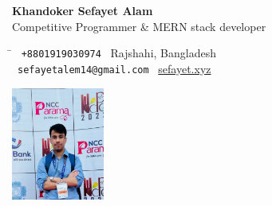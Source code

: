 \documentclass[a4paper,10pt]{article}
\begin{document}
\begin{minipage}{0.65\textwidth}
    \vspace{0.2in}
    \Huge \textbf{Khandoker Sefayet Alam} \\
    \large Competitive Programmer \& MERN stack developer \\
    \vspace{0.1in}
    \normalsize
    \begin{tabbing}
    \hspace{2in} \= \hspace{3in} \kill
    \faPhone \ \texttt{+8801919030974} \> \faMapMarker* \ Rajshahi, Bangladesh \\
    \faEnvelope \ \texttt{sefayetalem14@gmail.com} \> \faGlobe \ \href{https://sefayet.xyz}{sefayet.xyz} \\
    \end{tabbing}
\end{minipage}
\begin{minipage}{0.3\textwidth}
    \raggedleft
    \includegraphics[width=1.2in]{image.png} %
\end{minipage}
\end{document}
